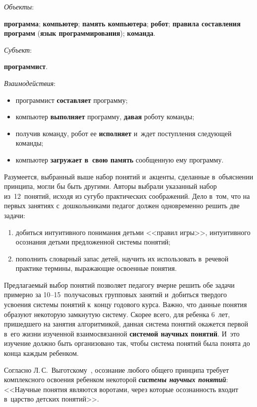 \begin{multicols}{2}
\textit{Объекты}: 

  \textbf{программа}; \textbf{компьютер}; \textbf{память компьютера}; 
\textbf{робот};  \textbf{правила составления программ} (\textbf{язык 
программирования}); \textbf{команда}.

\textit{Субъект}: 

  \textbf{программист}.

\textit{Взаимодействия}: 
\begin{itemize}
  \item программист \textbf{составляет} программу;
  \item компьютер \textbf{выполняет} программу, \textbf{давая} роботу 
команды;
\item получив команду, робот ее \textbf{исполняет} и~ждет поступления 
следующей   команды;
  \item компьютер \textbf{загружает в~свою память} сообщенную ему 
программу.
  \end{itemize}
  
  Разумеется, выбранный выше набор понятий и~акценты, сделанные 
в~объяснении принципа, могли бы быть другими. Авторы выбрали указанный 
набор из~12~понятий, исходя из сугубо практических соображений. Дело 
в~том, что на первых занятиях с~дошкольниками педагог должен одновременно 
решить две задачи:
  \begin{enumerate}[(1)]
  \item добиться интуитивного понимания детьми <<правил игры>>, 
интуитивного осознания детьми предложенной системы понятий;\\[-15pt]
  \item пополнить словарный запас детей, научить их использовать в~речевой 
практике термины, выражающие освоенные понятия.
  \end{enumerate}
  
    Предлагаемый выбор понятий позволяет педагогу вчерне решить обе 
задачи примерно за 10--15~получасовых групповых занятий и~добиться 
твердого усвоения системы понятий к~концу годового курса. Важно, что 
данные понятия образуют некоторую замкнутую систему. Скорее всего, для 
ребенка 6~лет, пришедшего на занятия алгоритмикой, данная система понятий 
окажется первой в~его жизни изученной взаимосвязанной \textbf{системой 
научных понятий}. И~это изучение должно быть организовано так, чтобы 
система понятий была понята до конца каждым ребенком.   
  
  Согласно Л.\,С.~Выготскому~\cite{7-bet}, осознание любого общего 
принципа требует комплексного освоения ребенком некоторой 
{\bfseries\textit{системы научных понятий}}: <<Научные понятия являются 
воротами, через которые осознанность входит в~царство детских понятий>>. 
  

\end{multicols}
